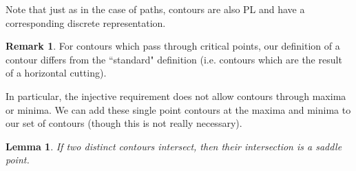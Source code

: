 \documentclass[11pt]{article}
\newtheorem{lemma}[theorem]{Lemma}
\theoremstyle{definition}
\newtheorem{remark}{Remark}
\begin{document}
Note that just as in the case of paths, contours are also PL and have a corresponding discrete representation.

\begin{remark}
For contours which pass through critical points, our definition of a contour differs from the ``standard" definition (i.e. contours which are the result of a horizontal cutting).  

In particular, the injective requirement does not allow contours through maxima or minima.  We can add these single point contours at the maxima and minima to our set of contours (though this is not really necessary).
\end{remark}

\begin{lemma} \label{lem:cont} If two distinct contours intersect, then their intersection is a saddle point.
\end{lemma} 
\end{document}
